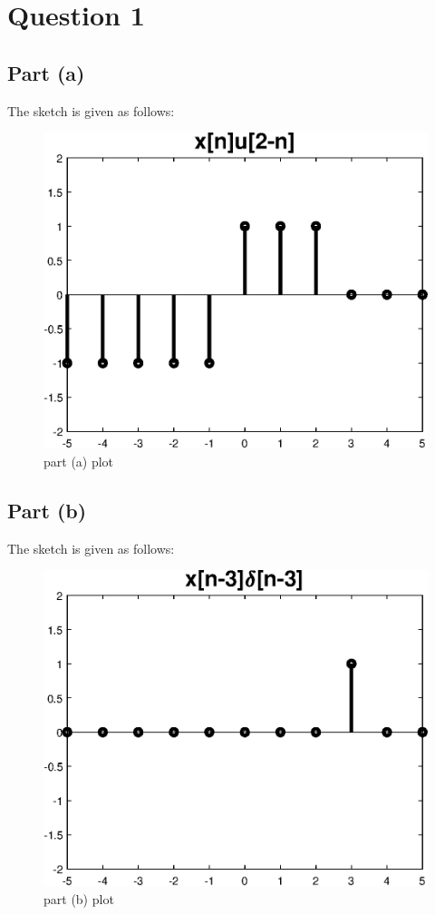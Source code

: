 \documentclass[12pt,letterpaper]{article}
\begin{document}
\section*{Question 1}
\subsection*{Part (a)}
The sketch is given as follows: 
\begin{figure}[h]
    \centering
    \includegraphics{figures/1a.eps}
    \caption{part (a) plot}
    \label{1a}
\end{figure}

\subsection*{Part (b)}
The sketch is given as follows: 
\begin{figure}[h]
    \centering
    \includegraphics{figures/1b.eps}
    \caption{part (b) plot}
    \label{1b}
\end{figure}
\end{document}
